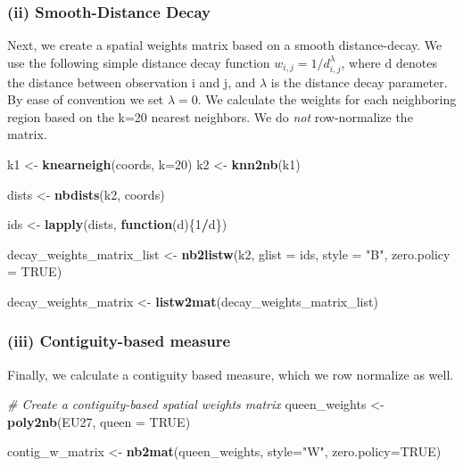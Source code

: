\documentclass[
  a4paper,
]{article}
\newenvironment{Shaded}{\begin{snugshade}}{\end{snugshade}}
\newcommand{\AttributeTok}[1]{\textcolor[rgb]{0.13,0.29,0.53}{#1}}
\newcommand{\CommentTok}[1]{\textcolor[rgb]{0.56,0.35,0.01}{\textit{#1}}}
\newcommand{\ConstantTok}[1]{\textcolor[rgb]{0.56,0.35,0.01}{#1}}
\newcommand{\ControlFlowTok}[1]{\textcolor[rgb]{0.13,0.29,0.53}{\textbf{#1}}}
\newcommand{\DecValTok}[1]{\textcolor[rgb]{0.00,0.00,0.81}{#1}}
\newcommand{\FunctionTok}[1]{\textcolor[rgb]{0.13,0.29,0.53}{\textbf{#1}}}
\newcommand{\NormalTok}[1]{#1}
\newcommand{\OtherTok}[1]{\textcolor[rgb]{0.56,0.35,0.01}{#1}}
\newcommand{\SpecialCharTok}[1]{\textcolor[rgb]{0.81,0.36,0.00}{\textbf{#1}}}
\newcommand{\StringTok}[1]{\textcolor[rgb]{0.31,0.60,0.02}{#1}}
\begin{document}
\hypertarget{ii-smooth-distance-decay}{%
\subsubsection{(ii) Smooth-Distance
Decay}\label{ii-smooth-distance-decay}}

Next, we create a spatial weights matrix based on a smooth
distance-decay. We use the following simple distance decay function
\(w_{i, j} = 1/d_{i,j}^{\lambda}\), where d denotes the distance between
observation i and j, and \(\lambda\) is the distance decay parameter. By
ease of convention we set \(\lambda = 0\). We calculate the weights for
each neighboring region based on the k=20 nearest neighbors. We do
\textit{not} row-normalize the matrix.

\begin{Shaded}
\begin{Highlighting}[]
\NormalTok{k1 }\OtherTok{\textless{}{-}} \FunctionTok{knearneigh}\NormalTok{(coords, }\AttributeTok{k=}\DecValTok{20}\NormalTok{)}
\NormalTok{k2 }\OtherTok{\textless{}{-}} \FunctionTok{knn2nb}\NormalTok{(k1)}

\NormalTok{dists }\OtherTok{\textless{}{-}} \FunctionTok{nbdists}\NormalTok{(k2, coords)}

\NormalTok{ids }\OtherTok{\textless{}{-}} \FunctionTok{lapply}\NormalTok{(dists, }\ControlFlowTok{function}\NormalTok{(d)\{}\DecValTok{1}\SpecialCharTok{/}\NormalTok{d\})}

\NormalTok{decay\_weights\_matrix\_list }\OtherTok{\textless{}{-}} \FunctionTok{nb2listw}\NormalTok{(k2, }\AttributeTok{glist =}\NormalTok{ ids, }\AttributeTok{style =} \StringTok{"B"}\NormalTok{, }\AttributeTok{zero.policy =} \ConstantTok{TRUE}\NormalTok{)}

\NormalTok{decay\_weights\_matrix }\OtherTok{\textless{}{-}} \FunctionTok{listw2mat}\NormalTok{(decay\_weights\_matrix\_list)}
\end{Highlighting}
\end{Shaded}

\hypertarget{iii-contiguity-based-measure}{%
\subsubsection{(iii) Contiguity-based
measure}\label{iii-contiguity-based-measure}}

Finally, we calculate a contiguity based measure, which we row normalize
as well.

\begin{Shaded}
\begin{Highlighting}[]
\CommentTok{\# Create a contiguity{-}based spatial weights matrix}
\NormalTok{queen\_weights }\OtherTok{\textless{}{-}} \FunctionTok{poly2nb}\NormalTok{(EU27, }\AttributeTok{queen =} \ConstantTok{TRUE}\NormalTok{)}

\NormalTok{contig\_w\_matrix }\OtherTok{\textless{}{-}} \FunctionTok{nb2mat}\NormalTok{(queen\_weights, }\AttributeTok{style=}\StringTok{"W"}\NormalTok{, }\AttributeTok{zero.policy=}\ConstantTok{TRUE}\NormalTok{)}
\end{Highlighting}
\end{Shaded}
\end{document}
